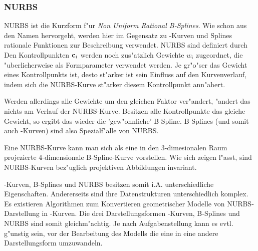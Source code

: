%
%

\subsubsection{NURBS}
\label{nurbs}
NURBS ist die Kurzform f"ur \emph{Non Uniform Rational B-Splines}. 
Wie schon aus den Namen hervorgeht, werden hier im Gegensatz zu \bez-Kurven 
und Splines rationale Funktionen zur Beschreibung verwendet. 
NURBS sind definiert durch
Den Kontrollpunkten ${\bf c}_i$ werden noch zus"atzlich Gewichte $w_i$ 
zugeordnet, die "uberlicherweise als Formparameter verwendet werden.
Je gr"o"ser das Gewicht eines Kontrollpunkts ist, desto st"arker ist sein 
Einfluss auf den Kurvenverlauf, indem sich die NURBS-Kurve st"arker diesem 
Kontrollpunkt ann"ahert.

Werden allerdings alle Gewichte um den gleichen Faktor ver"andert, "andert das 
nichts am Verlauf der NURBS-Kurve. Besitzen alle Kontrollpunkte das gleiche 
Gewicht, so ergibt das wieder die 'gew"ohnliche' B-Spline. B-Splines (und 
somit auch \bez-Kurven) sind also Spezialf"alle von NURBS.

Eine NURBS-Kurve kann man sich als eine in den 3-dimesionalen Raum projezierte 
4-dimensionale B-Spline-Kurve vorstellen.
Wie sich zeigen l"asst, sind NURBS-Kurven bez"uglich projektiven Abbildungen 
invariant.

\bez-Kurven, B-Splines und NURBS besitzen somit i.A. unterschiedliche 
Eigenschaften. Andererseits sind ihre Datenstrukturen unterschiedlich komplex. 
Es existieren Algorithmen zum Konvertieren geometrischer Modelle von 
NURBS-Darstellung in \bez-Kurven. Die drei Darstellungsformen \bez-Kurven, 
B-Splines und NURBS sind somit gleichm"achtig. Je nach Aufgabenstellung 
kann es evtl. g"unstig sein, vor der Bearbeitung des Modells die eine in eine 
andere Darstellungsform umzuwandeln.

